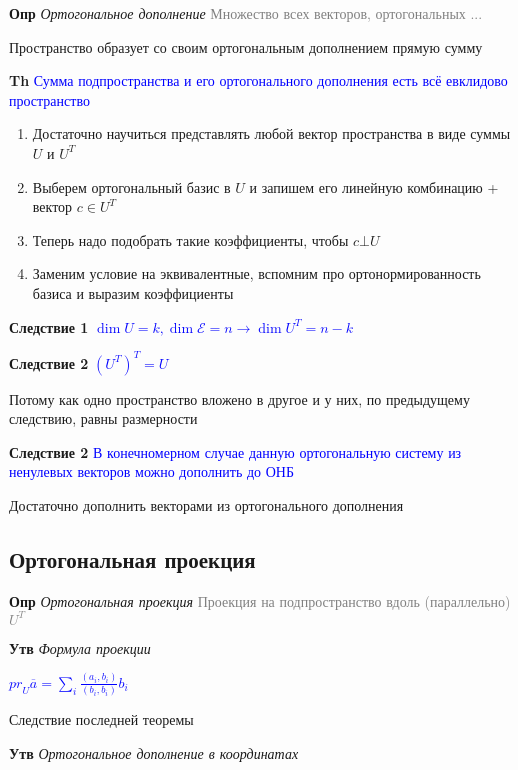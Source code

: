 \documentclass[a4paper, 14pt]{article}
\begin{document}
    \textbf{Опр} \textit{Ортогональное дополнение} \textcolor{gray}{Множество всех векторов, ортогональных ...}

    Пространство образует со своим ортогональным дополнением прямую сумму

    \textbf{Th} \textcolor{blue}{Сумма подпространства и его ортогонального дополнения есть всё евклидово пространство}

    \begin{enumerate}
        \item Достаточно научиться представлять любой вектор пространства в виде суммы $U$ и $U^T$
        \item Выберем ортогональный базис в $U$ и запишем его линейную комбинацию + вектор $c \in  U^T$
        \item Теперь надо подобрать такие коэффициенты, чтобы $c \bot U$
        \item Заменим условие на эквивалентные, вспомним про ортонормированность базиса и выразим коэффициенты
    \end{enumerate}

    \textbf{Следствие 1} \textcolor{blue}{$\dim U = k, \dim \mathscr{E} = n \rightarrow \dim U^T = n - k$}

    \textbf{Следствие 2} \textcolor{blue}{$(U^T)^T = U$}

    Потому как одно пространство вложено в другое и у них, по предыдущему следствию, равны размерности

    \textbf{Следствие 2} \textcolor{blue}{В конечномерном случае данную ортогональную систему из ненулевых векторов
    можно дополнить до ОНБ}

    Достаточно дополнить векторами из ортогонального дополнения

    \subsection{Ортогональная проекция}

    \textbf{Опр} \textit{Ортогональная проекция} \textcolor{gray}{Проекция на подпространство вдоль (параллельно) $U^T$}

    \textbf{Утв} \textit{Формула проекции}

    \textcolor{blue}{${pr}_U \overline{a} = \sum_i \frac{(a_i, b_i)}{(b_i, b_i)} b_i$}

    Следствие последней теоремы

    \textbf{Утв} \textit{Ортогональное дополнение в координатах}
\end{document}
